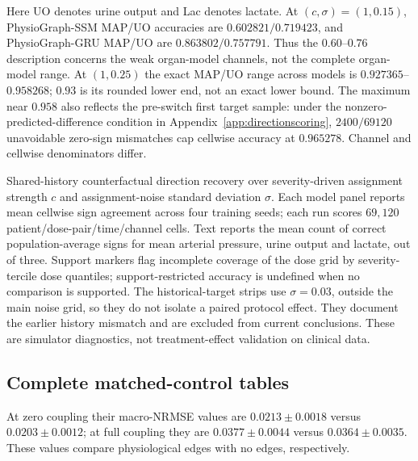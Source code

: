 Here UO denotes urine output and Lac denotes lactate. At $(c,\sigma)=(1,0.15)$, PhysioGraph-SSM MAP/UO accuracies are $0.602821/0.719423$, and PhysioGraph-GRU MAP/UO are $0.863802/0.757791$. Thus the $0.60$--$0.76$ description concerns the weak organ-model channels, not the complete organ-model range. At $(1,0.25)$ the exact MAP/UO range across models is $0.927365$--$0.958268$; $0.93$ is its rounded lower end, not an exact lower bound. The maximum near $0.958$ also reflects the pre-switch first target sample: under the nonzero-predicted-difference condition in Appendix~\ref{app:directionscoring}, $2400/69120$ unavoidable zero-sign mismatches cap cellwise accuracy at $0.965278$. Channel and cellwise denominators differ.

Shared-history counterfactual direction recovery over severity-driven assignment strength $c$ and assignment-noise standard deviation $\sigma$. Each model panel reports mean cellwise sign agreement across four training seeds; each run scores $69{,}120$ patient/dose-pair/time/channel cells. Text reports the mean count of correct population-average signs for mean arterial pressure, urine output and lactate, out of three. Support markers flag incomplete coverage of the dose grid by severity-tercile dose quantiles; support-restricted accuracy is undefined when no comparison is supported. The historical-target strips use $\sigma=0.03$, outside the main noise grid, so they do not isolate a paired protocol effect. They document the earlier history mismatch and are excluded from current conclusions. These are simulator diagnostics, not treatment-effect validation on clinical data.


\subsection{Complete matched-control tables}
At zero coupling their macro-NRMSE values are $0.0213\pm0.0018$ versus $0.0203\pm0.0012$; at full coupling they are $0.0377\pm0.0044$ versus $0.0364\pm0.0035$. These values compare physiological edges with no edges, respectively.

